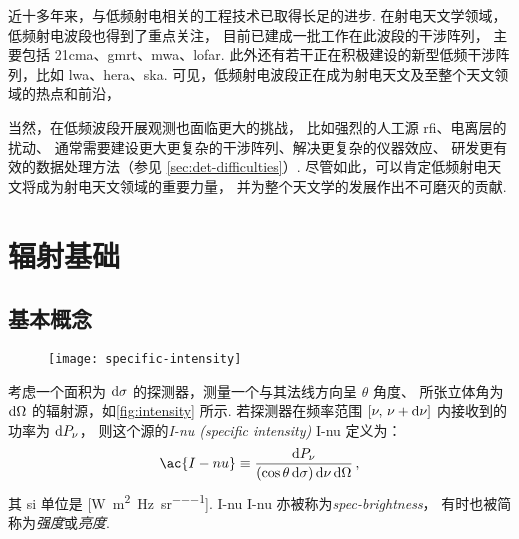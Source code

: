 近十多年来，与低频射电相关的工程技术已取得长足的进步.
在射电天文学领域，低频射电波段也得到了重点关注，
目前已建成一批工作在此波段的干涉阵列，
主要包括 \ac{21cma}、\ac{gmrt}、\ac{mwa}、\ac{lofar}.
此外还有若干正在积极建设的新型低频干涉阵列，比如 \ac{lwa}、\ac{hera}、\ac{ska}.
可见，低频射电波段正在成为射电天文及至整个天文领域的热点和前沿，

当然，在低频波段开展观测也面临更大的挑战，
比如强烈的人工源 \ac{rfi}、电离层的扰动、
通常需要建设更大更复杂的干涉阵列、解决更复杂的仪器效应、
研发更有效的数据处理方法（参见 \autoref{sec:det-difficulties}）.
尽管如此，可以肯定低频射电天文将成为射电天文领域的重要力量，
并为整个天文学的发展作出不可磨灭的贡献.


\section{辐射基础}
\label{sec:radiation}

\subsection{基本概念}

\begin{figure}[htp]
  \centering
  \texttt{[image: specific-intensity]}
  \label{fig:intensity}
\end{figure}

考虑一个面积为 $\mathrm{d}\sigma$ 的探测器，测量一个与其法线方向呈 $\theta$ 角度、
所张立体角为 $\mathrm{d}\Omega$ 的辐射源，如\autoref{fig:intensity} 所示.
若探测器在频率范围 $[\nu, \,\nu+\mathrm{d}\nu]$ 内接收到的功率为 $\mathrm{d}P_{\nu}$，
则这个源的\emph{\acl{I-nu} (specific intensity)} \ac{I-nu} 定义为：
\begin{equation}
  \label{eq:intensity}
  \ac{I-nu} \equiv
    \frac{\D{P_{\nu}}}{(\cos\theta\,\D{\sigma}) \,\D{\nu} \,\D{\Omega}} \,,
\end{equation}
其 \ac{si} 单位是 [\si{\watt\per\square\meter\per\hertz\per\steradian}].
\acl{I-nu} \ac{I-nu} 亦被称为\emph{\ac{spec-brightness}}，
有时也被简称为\emph{强度}或\emph{亮度}.

